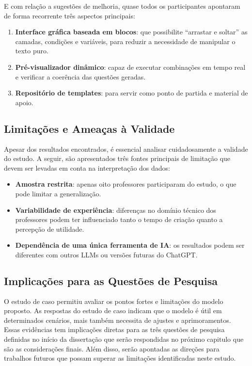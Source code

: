 E com relação a sugestões de melhoria, quase todos os participantes apontaram de forma recorrente três aspectos principais:

\begin{enumerate}
\item \textbf{Interface gráfica baseada em blocos}:  que possibilite “arrastar e soltar” as camadas, condições e variáveis, para reduzir a necessidade de manipular o texto puro.
\item \textbf{Pré-visualizador dinâmico}: capaz de executar combinações em tempo real e verificar a coerência das questões geradas.
\item \textbf{Repositório de templates}: para servir como ponto de partida e material de apoio.
\end{enumerate}

\subsection{Limitações e Ameaças à Validade}
Apesar dos resultados encontrados, é essencial analisar cuidadosamente a validade do estudo. A seguir, são apresentados  três fontes principais de limitação que devem ser levadas em conta na interpretação dos dados:
\begin{itemize}
\item \textbf{Amostra restrita}: apenas oito professores participaram do estudo, o que pode limitar a generalização.
\item \textbf{Variabilidade de experiência}: diferenças no domínio técnico dos professores podem ter influenciado tanto o tempo de criação quanto a percepção de utilidade.
\item \textbf{Dependência de uma única ferramenta de IA}: os resultados podem ser diferentes com outros LLMs ou versões futuras do ChatGPT.
\end{itemize}



\subsection{Implicações para as Questões de Pesquisa}

O estudo de caso permitiu avaliar os pontos fortes e limitações do modelo proposto. As respostas do estudo de caso indicam que o modelo é útil em determinados cenários, mais também necessita de ajustes e aprimoramentos.
Essas evidências tem implicações diretas para as três questões de pesquisa definidas no início da dissertação que serão respondidas no próximo capitulo que são as considerações finais. Além disso, serão apontadas as direções para trabalhos futuros que possam superar as limitações identificadas neste estudo.